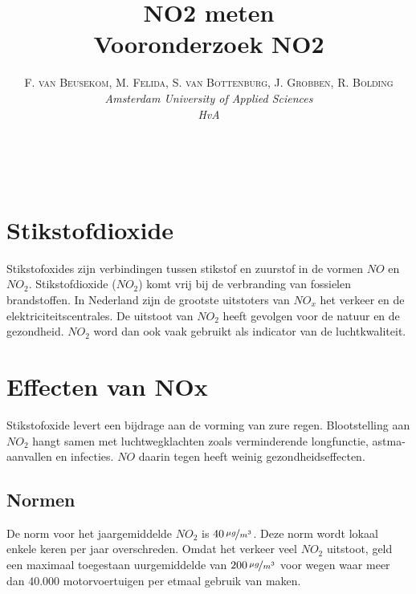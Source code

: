 \documentclass[a4paper, 11pt]{article} %
\title{\textbf{NO2 meten}\\ %
Vooronderzoek NO2} %
\author{\textsc{F. van Beusekom, M. Felida, S. van Bottenburg, J. Grobben, R. Bolding} %
\\{\textit{Amsterdam University of Applied Sciences\\ 
HvA}}} %
\makeatletter
\renewcommand{\maketitle}{ %
\begin{flushright} %
{\LARGE\@title} %

\vspace{50pt} %

{\large\@author} %
\\\@date %

\vspace{40pt} %
\end{flushright}
}
\makeatother
\begin{document}
\captionsetup{justification=centering}
\hypersetup{hidelinks=true}
\maketitle %




\vspace{10pt} %

\newpage
\section{Stikstofdioxide}

Stikstofoxides zijn verbindingen tussen stikstof en zuurstof in de vormen $NO$ en $NO_2$. Stikstofdioxide ($NO_2$) komt vrij bij de verbranding van fossielen brandstoffen. In Nederland zijn de grootste uitstoters van $NO_x$ het verkeer en de elektriciteitscentrales.  De uitstoot van $NO_2$ heeft gevolgen voor de natuur en de gezondheid. $NO_2$ word dan ook vaak gebruikt als indicator van de luchtkwaliteit.


\section{Effecten van NOx}

Stikstofoxide levert een bijdrage aan de vorming van zure regen. Blootstelling aan $NO_2$ hangt samen met luchtwegklachten zoals verminderende longfunctie, astma-aanvallen en infecties. $NO$ daarin tegen heeft weinig gezondheidseffecten. 


\subsection{Normen}

De norm voor het jaargemiddelde $NO_2$ is 	$40\,\nicefrac{\mu g}{m^{3}}$. Deze norm wordt lokaal enkele keren per jaar overschreden. Omdat het verkeer veel $NO_2$ uitstoot, geld een maximaal toegestaan uurgemiddelde van $200\,\nicefrac{\mu g}{m^{3}}$ voor wegen waar meer dan 40.000 motorvoertuigen per etmaal gebruik van maken.
\end{document}
